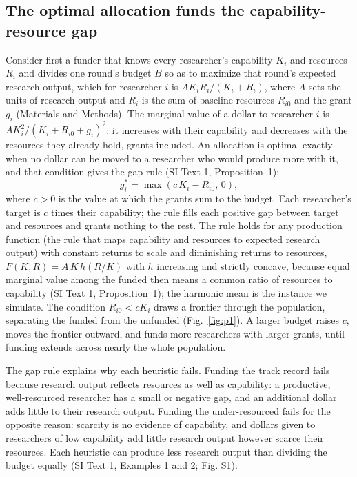 \documentclass[9pt,twocolumn,twoside]{pnas-new}
\begin{document}
\subsection*{The optimal allocation funds the capability-resource gap}
Consider first a funder that knows every researcher's capability $K_i$ and resources $R_i$ and divides one round's budget $B$ so as to maximize that round's expected research output, which for researcher $i$ is $AK_iR_i/(K_i + R_i)$, where $A$ sets the units of research output and $R_i$ is the sum of baseline resources $R_{i0}$ and the grant $g_i$ (Materials and Methods). The marginal value of a dollar to researcher $i$ is $AK_i^2/(K_i + R_{i0} + g_i)^2$: it increases with their capability and decreases with the resources they already hold, grants included. An allocation is optimal exactly when no dollar can be moved to a researcher who would produce more with it, and that condition gives the gap rule (SI Text 1, Proposition~1):
\[
g_i^* = \max(c\,K_i - R_{i0},\, 0),
\]
where $c > 0$ is the value at which the grants sum to the budget. Each researcher's target is $c$ times their capability; the rule fills each positive gap between target and resources and grants nothing to the rest. The rule holds for any production function (the rule that maps capability and resources to expected research output) with constant returns to scale and diminishing returns to resources, $F(K, R) = A\,K\,h(R/K)$ with $h$ increasing and strictly concave, because equal marginal value among the funded then means a common ratio of resources to capability (SI Text 1, Proposition~1); the harmonic mean is the instance we simulate. The condition $R_{i0} < cK_i$ draws a frontier through the population, separating the funded from the unfunded (Fig.~\ref{fig:p1}). A larger budget raises $c$, moves the frontier outward, and funds more researchers with larger grants, until funding extends across nearly the whole population.

The gap rule explains why each heuristic fails. Funding the track record fails because research output reflects resources as well as capability: a productive, well-resourced researcher has a small or negative gap, and an additional dollar adds little to their research output. Funding the under-resourced fails for the opposite reason: scarcity is no evidence of capability, and dollars given to researchers of low capability add little research output however scarce their resources. Each heuristic can produce less research output than dividing the budget equally (SI Text 1, Examples 1 and 2; Fig. S1).
\end{document}
